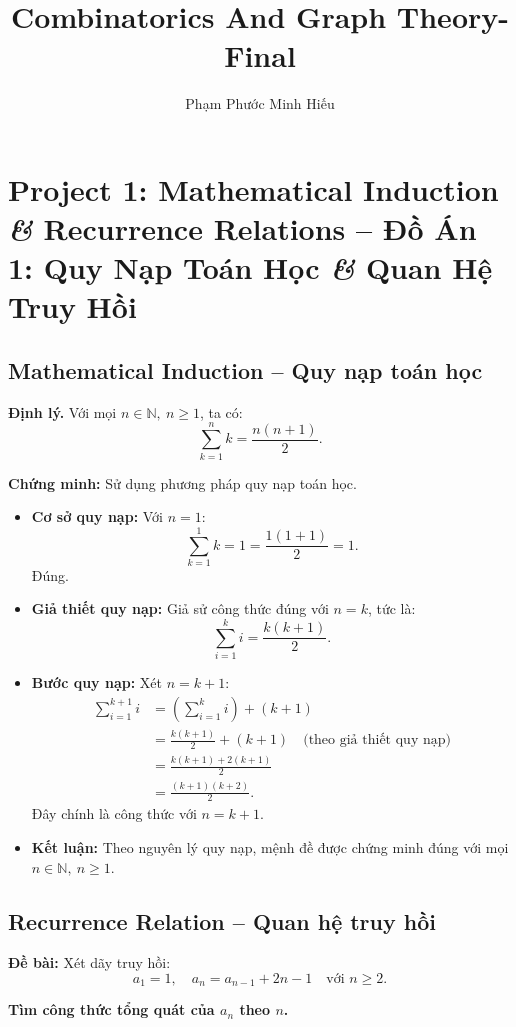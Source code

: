 \documentclass{article}
\title{Combinatorics And Graph Theory-Final}
\author{Phạm Phước Minh Hiếu}
\begin{document}
	\section{Project 1: Mathematical Induction {\it\&} Recurrence Relations -- Đồ Án 1: Quy Nạp Toán Học {\it\&} Quan Hệ Truy Hồi}
	
	\subsection{Mathematical Induction -- Quy nạp toán học}
	
	\textbf{Định lý.} Với mọi $n \in \mathbb{N},\ n \ge 1$, ta có:
	\[
	\sum_{k=1}^{n} k = \frac{n(n+1)}{2}.
	\]
	
	\textbf{Chứng minh:} Sử dụng phương pháp quy nạp toán học.
	
	\begin{itemize}[leftmargin=1.5cm]
		\item \textbf{Cơ sở quy nạp:} Với $n = 1$:
		\[
		\sum_{k=1}^{1} k = 1 = \frac{1(1+1)}{2} = 1.
		\]
		Đúng.
		
		\item \textbf{Giả thiết quy nạp:} Giả sử công thức đúng với $n = k$, tức là:
		\[
		\sum_{i=1}^{k} i = \frac{k(k+1)}{2}.
		\]
		
		\item \textbf{Bước quy nạp:} Xét $n = k + 1$:
		\begin{align*}
			\sum_{i=1}^{k+1} i &= \left(\sum_{i=1}^{k} i\right) + (k+1) \\
			&= \frac{k(k+1)}{2} + (k+1) \quad \text{(theo giả thiết quy nạp)}\\
			&= \frac{k(k+1) + 2(k+1)}{2} \\
			&= \frac{(k+1)(k + 2)}{2}.
		\end{align*}
		Đây chính là công thức với $n = k + 1$.
		
		\item \textbf{Kết luận:} Theo nguyên lý quy nạp, mệnh đề được chứng minh đúng với mọi $n \in \mathbb{N},\ n \ge 1$.
	\end{itemize}
	
	\subsection{Recurrence Relation -- Quan hệ truy hồi}
	
	\textbf{Đề bài:} Xét dãy truy hồi:
	\[
	a_1 = 1,\quad a_n = a_{n-1} + 2n - 1 \quad \text{với } n \ge 2.
	\]
	
	\textbf{Tìm công thức tổng quát của $a_n$ theo $n$.}
	
\end{document}
